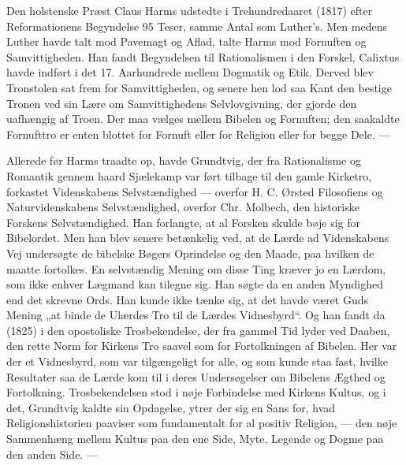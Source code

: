 \documentclass[12pt,a4paper,openany]{book}
\newcommand{\opage}[1]{\marginnote{\footnotesize\textit{[#1]}}}
\begin{document}
Den holstenske Præst Claus Harms udstedte i Trehundredaaret
(1817) efter Reformationens Begyndelse 95 Teser, samme Antal som
Luther’s. Men medens Luther havde talt mod Pavemagt og Aflad,
talte Harms mod Fornuften og Samvittigheden. Han fandt Begyndelsen
til Rationalismen i den Forskel, Calixtus havde indført i det
17. Aarhundrede mellem Dogmatik og Etik. Derved blev Tronstolen
sat frem for Samvittigheden, og senere hen lod saa Kant den bestige
\opage{117}Tronen ved sin Lære om Samvittighedens Selvlovgivning, der gjorde
den uafhængig af Troen. Der maa vælges mellem Bibelen og Fornuften;
den saakaldte Fornufttro er enten blottet for Fornuft eller
for Religion eller for begge Dele. ---

Allerede før Harms traadte op, havde Grundtvig, der fra Rationalisme
og Romantik gennem haard Sjælekamp var ført tilbage til
den gamle Kirketro, forkastet Videnskabens Selvstændighed --- overfor
H. C. Ørsted Filosofiens og Naturvidenskabens Selvstændighed,
overfor Chr. Molbech, den historiske Forskens Selvstændighed. Han
forlangte, at al Forsken skulde bøje sig for Bibelordet. Men han blev
senere betænkelig ved, at de Lærde ad Videnskabens Vej undersøgte
de bibelske Bøgers Oprindelse og den Maade, paa hvilken de maatte
fortolkes. En selvstændig Mening om disse Ting kræver jo en Lærdom,
som ikke enhver Lægmand kan tilegne sig. Han søgte da en
anden Myndighed end det skrevne Ords. Han kunde ikke tænke sig,
at det havde været Guds Mening „at binde de Ulærdes Tro til de
Lærdes Vidnesbyrd“. Og han fandt da (1825) i den opostoliske Trosbekendelse,
der fra gammel Tid lyder ved Daaben, den rette Norm
for Kirkens Tro saavel som for Fortolkningen af Bibelen. Her var
der et Vidnesbyrd, som var tilgængeligt for alle, og som kunde staa
fast, hvilke Resultater saa de Lærde kom til i deres Undersøgelser
om Bibelens Ægthed og Fortolkning. Trosbekendelsen stod i nøje
Forbindelse med Kirkens Kultus, og i det, Grundtvig kaldte sin Opdagelse,
ytrer der sig en Sans for, hvad Religionshistorien paaviser
som fundamentalt for al positiv Religion, --- den nøje Sammenhæng
mellem Kultus paa den ene Side, Myte, Legende og Dogme paa den
anden Side. ---
\end{document}
